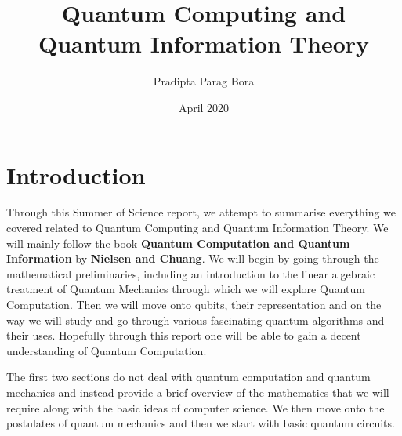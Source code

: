 \documentclass{article}
\title{Quantum Computing and Quantum Information Theory}
\author{Pradipta Parag Bora}
\date{April 2020}
\numberwithin{equation}{section}
\theoremstyle{definition}
\numberwithin{definition}{section}
\numberwithin{theorem}{section}
\theoremstyle{remark}
\numberwithin{exercise}{section}
\begin{document}
\maketitle

\tableofcontents

\section{Introduction}
Through this Summer of Science report, we attempt to summarise everything we covered related to Quantum Computing and Quantum Information Theory. We will mainly follow the book \textbf{Quantum Computation and Quantum Information} by \textbf{Nielsen and Chuang}. We will begin by going through the mathematical preliminaries, including an introduction to the linear algebraic treatment of Quantum Mechanics through which we will explore Quantum Computation. Then we will move onto qubits, their representation and on the way we will study and go through various fascinating quantum algorithms and their uses. Hopefully through this report one will be able to gain a decent understanding of Quantum Computation. 

The first two sections do not deal with quantum computation and quantum mechanics and instead provide a brief overview of the mathematics that we will require along with the basic ideas of computer science. We then move onto the postulates of quantum mechanics and then we start with basic quantum circuits.








\end{document}
